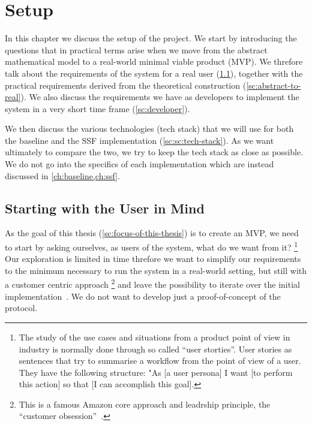 \chapter{Setup}\label{ch:setup}

In this chapter we discuss the setup of the project.
We start by introducing the questions that in practical
terms arise when we move from the abstract mathematical
model to a real-world minimal viable product (MVP).
We threfore talk about the requirements of the system
for a real user (\cref{sc:real-user}), together with the 
practical requirements
derived from the theoretical construction (\cref{sc:abstract-to-real}).
We also discuss the requirements we have as developers
to implement the system in a very short time frame
(\cref{sc:developer}).

We then discuss the various technologies (tech stack) 
that we will use for both the baseline and the SSF 
implementation (\cref{sc:sc:tech-stack}).
As we want ultimately to compare the two, we
try to keep the tech stack as close as possible.
We do not go into the specifics of each implementation
which are instead discussed in \cref{ch:baseline,ch:ssf}.

\section{Starting with the User in Mind}\label{sc:real-user}

As the goal of this thesis (\cref{sc:focus-of-this-thesis})
is to create an MVP, we need to start by asking ourselves,
as users of the system, what do we want from it?
\footnote{The study of the use cases and situations from a product 
point of view in industry is normally done through so called ``user storties''.
User stories as sentences that try to summarise a workflow from the
point of view of a user. They have the following structure:
"As [a user persona] I want [to perform this action] so that [I can accomplish this goal].}
Our exploration is limited in time threfore we want to simplify
our requirements to the minimum necessary to run the system
in a real-world setting, 
but still with a customer centric approach
\footnote{This is a famous Amazon core approach and leadrship principle, the ``customer obsession''~\cite{AmazonLeadershipPrinciples}.}
and leave the possibility to iterate over the initial implementation~\cite{ries2011startup}.
We do not want to develop just a proof-of-concept of the protocol.


